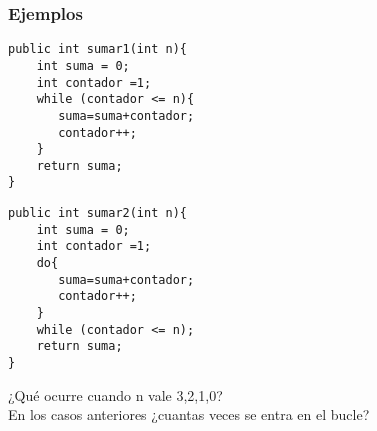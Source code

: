 \documentclass{beamer}
\begin{document}
\begin{frame}[fragile]
    \frametitle{Ejemplos}
    \begin{multicols}{2}
\begin{small}
   \begin{verbatim}
public int sumar1(int n){
    int suma = 0;
    int contador =1;
    while (contador <= n){
       suma=suma+contador;
       contador++;
    }
    return suma;
}
\end{verbatim}
\pause
\begin{verbatim}
public int sumar2(int n){
    int suma = 0;
    int contador =1;
    do{
       suma=suma+contador;
       contador++;
    }
    while (contador <= n);
    return suma;
}
\end{verbatim}

\end{small}  
\end{multicols}
\pause
\alert{¿Qué ocurre cuando n vale 3,2,1,0?}\\
\pause
\alert{En los casos anteriores ¿cuantas veces se entra en el bucle?}
\end{frame}
\end{document}
